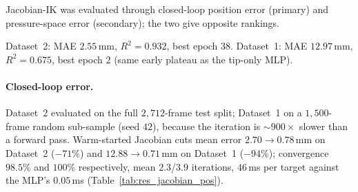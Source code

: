 Jacobian-IK was evaluated through closed-loop position error (primary) and pressure-space error (secondary); the two give opposite rankings.

Dataset~2: MAE $2.55$\,mm, $R^{2} = 0.932$, best epoch $38$. Dataset~1: MAE $12.97$\,mm, $R^{2} = 0.675$, best epoch $2$ (same early plateau as the tip-only MLP).

\paragraph{Closed-loop error.}
Dataset~2 evaluated on the full $2{,}712$-frame test split; Dataset~1 on a $1{,}500$-frame random sub-sample (seed $42$), because the iteration is $\sim$$900\times$ slower than a forward pass. Warm-started Jacobian cuts mean error $2.70 \to 0.78$\,mm on Dataset~2 ($-71\%$) and $12.88 \to 0.71$\,mm on Dataset~1 ($-94\%$); convergence $98.5\%$ and $100\%$ respectively, mean $2.3$/$3.9$ iterations, $46$\,ms per target against the MLP's $0.05$\,ms (Table~\ref{tab:res_jacobian_pos}).

